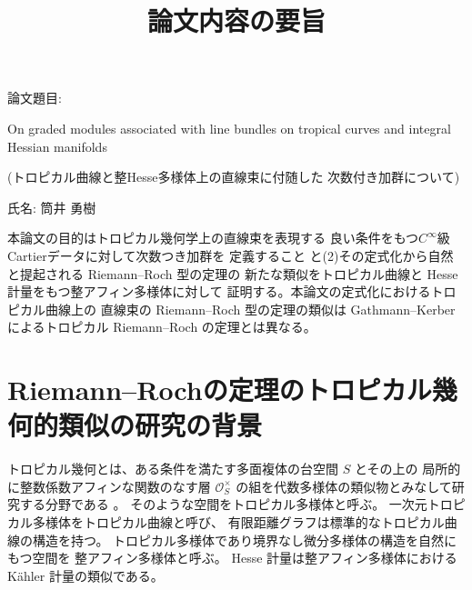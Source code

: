 \documentclass[uplatex,dvipdfmx,12pt]{jsarticle}
\title{論文内容の要旨
}
\date{}
\numberwithin{equation}{section}
\theoremstyle{definition}
\newcommand{\beforesection}{\vspace{-20pt}}
\newcommand{\aftersection}{\vspace{-10pt}}
\begin{document}
\setlength{\baselineskip}{-5pt}
\setlength{\parskip}{2pt}

\linenumbers

\maketitle
{\large
\noindent
論文題目:

On graded modules associated with line bundles on 
tropical curves and integral Hessian manifolds

(トロピカル曲線と整Hesse多様体上の直線束に付随した
次数付き加群について)
}

\vspace{5pt}

\noindent
{\large
氏名: 筒井 勇樹
}

\vspace{10pt}

\setlength{\baselineskip}{-3pt}
\setlength{\parskip}{2pt}

本論文の目的はトロピカル幾何学上の直線束を表現する
良い条件をもつ$C^{\infty}$級Cartierデータに対して次数つき加群を
定義すること
と(2)その定式化から自然と提起される Riemann--Roch 型の定理の
新たな類似をトロピカル曲線と Hesse 計量をもつ整アフィン多様体に対して
証明する。本論文の定式化におけるトロピカル曲線上の
直線束の Riemann--Roch 型の定理の類似は Gathmann--Kerber
によるトロピカル Riemann--Roch の定理とは異なる。

\beforesection

\section{Riemann--Rochの定理のトロピカル幾何的類似の研究の背景}

\aftersection

トロピカル幾何とは、ある条件を満たす多面複体の台空間 $S$ とその上の
局所的に整数係数アフィンな関数のなす層 
$\mathcal{O}_S^{\times}$
の組を代数多様体の類似物とみなして研究する分野である
\cite{mikhalkinTropicalEigenwaveIntermediate2014a,
gross2019sheaftheoretic}。
そのような空間をトロピカル多様体と呼ぶ。
一次元トロピカル多様体をトロピカル曲線と呼び、
有限距離グラフは標準的なトロピカル曲線の構造を持つ。
トロピカル多様体であり境界なし微分多様体の構造を自然にもつ空間を
整アフィン多様体と呼ぶ。
Hesse 計量は整アフィン多様体における
K\"ahler 計量の類似である。
\end{document}
